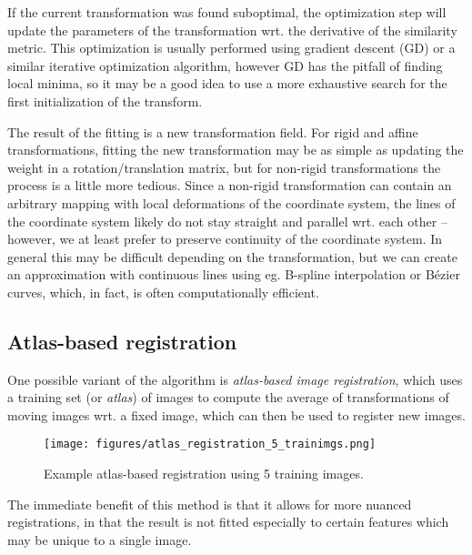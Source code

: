 If the current transformation was found suboptimal, the optimization step will
update the parameters of the transformation wrt. the derivative of the
similarity metric. This optimization is usually performed using gradient descent
(GD) or a similar iterative optimization algorithm, however GD has the pitfall
of finding local minima, so it may be a good idea to use a more exhaustive
search for the first initialization of the transform.

The result of the fitting is a new transformation field. For rigid and affine
transformations, fitting the new transformation may be as simple as updating the
weight in a rotation/translation matrix, but for non-rigid transformations the
process is a little more tedious. Since a non-rigid transformation can contain
an arbitrary mapping with local deformations of the coordinate system, the lines
of the coordinate system likely do not stay straight and parallel wrt. each
other -- however, we at least prefer to preserve continuity of the coordinate
system. In general this may be difficult depending on the transformation, but we
can create an approximation with continuous lines using eg. B-spline
interpolation or Bézier curves, which, in fact, is often computationally
efficient\cite{wu}.


\subsection{Atlas-based registration}

One possible variant of the algorithm is \textit{atlas-based image
registration}, which uses a training set (or \textit{atlas}) of images to
compute the average of transformations of moving images wrt. a fixed image,
which can then be used to register new images.
\vspace{-0.8cm}

\begin{figure}[H]
  \texttt{[image: figures/atlas\_registration\_5\_trainimgs.png]}
  \caption{{\footnotesize Example atlas-based registration using 5 training
  images.}}
  \label{fig:atlasreg1}
\end{figure}
\vspace{-0.5cm}

The immediate benefit of this method is that it allows for more nuanced
registrations, in that the result is not fitted especially to certain features
which may be unique to a single image.

